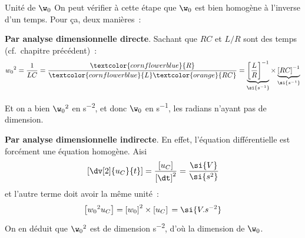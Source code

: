 \documentclass[../main/main.tex]{subfiles}
\begin{document}
\begin{rema}[label=rema:unité]{Unité de $\w_0$}
    On peut vérifier à cette étape que $\w_0$ est bien homogène à l'inverse d'un
    temps. Pour ça, deux manières~:

    \begin{remaside}
        \textbf{Par analyse dimensionnelle directe}. Sachant que $RC$ et $L/R$
        sont des temps (cf.\ chapitre précédent)~:
        \begin{align*}
            w_0{}^2 = \frac{1}{LC} =
                \frac{\textcolor{cornflowerblue}{R}}
                {\textcolor{cornflowerblue}{L}\textcolor{orange}{RC}}
                = \underbrace{\left[ \frac{L}{R}
                \right]^{-1}}_{\si{s^{-1}}}\times
                \underbrace{\left[ RC \right]^{-1}}_{\si{s^{-1}}}
        \end{align*}

        Et on a bien $\w_0{}^2$ en \si{s^{-2}}, et donc $\w_0$ en \si{s^{-1}},
        les radians n'ayant pas de dimension.

        \tcblower
        \textbf{Par analyse dimensionnelle indirecte}. En effet, l'équation
        différentielle est forcément une équation homogène. Aisi
        \begin{equation*}
            \left[ \dv[2]{u_C}{t} \right] =
                \frac{\left[u_C\right]}{\left[\dt\right]^2}\\
                                          = \frac{\si{V}}{\si{s^2}}
        \end{equation*}
        et l'autre terme doit avoir la même unité~:
        \begin{equation*}
            \left[ w_0{}^2u_C \right] = \left[ w_0 \right]^2\times \left[
            u_C \right]\\
                                      = \si{V.s^{-2}}
        \end{equation*}
        On en déduit que $\w_0{}^2$ est de dimension \si{s^{-2}}, d'où la
        dimension de $\w_0$.
    \end{remaside}
\end{rema}
\end{document}
